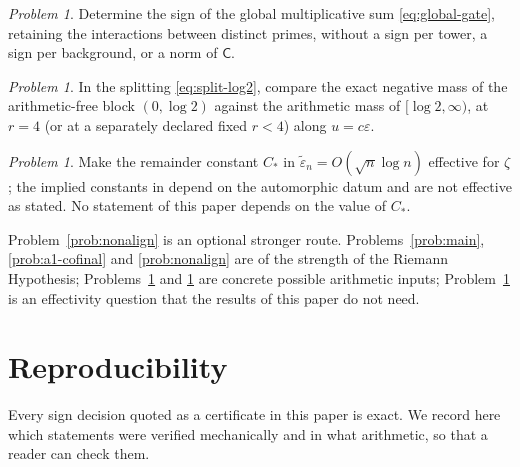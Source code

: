 \documentclass[11pt]{amsart}
\theoremstyle{definition}
\theoremstyle{remark}
\newtheorem{problem}[theorem]{Problem}
\theoremstyle{definition}
\newcommand{\eps}{\varepsilon}
\newcommand{\Cc}{\mathsf{C}}
\begin{document}
\begin{problem}\label{prob:global-sum}
Determine the sign of the global multiplicative sum \eqref{eq:global-gate}, retaining the
interactions between distinct primes, without a sign per tower, a sign per background, or a norm of
$\Cc$.
\end{problem}

\begin{problem}\label{prob:mass}
In the splitting \eqref{eq:split-log2}, compare the exact negative mass of the arithmetic-free block
$(0,\log2)$ against the arithmetic mass of $[\log2,\infty)$, at $r=4$ (or at a separately
declared fixed $r<4$) along $u=c\eps$.
\end{problem}

\begin{problem}\label{prob:effective}
Make the remainder constant $C_*$ in $\widetilde\eps_n=O(\sqrt n\log n)$ effective for $\zeta$;
the implied constants in \cite{Lagarias2007} depend on the automorphic datum and are not effective
as stated.  No statement of this paper depends on the value of $C_*$.
\end{problem}

Problem~\ref{prob:nonalign} is an optional stronger route. Problems~\ref{prob:main},
\ref{prob:a1-cofinal} and \ref{prob:nonalign} are of the strength of the Riemann Hypothesis;
Problems~\ref{prob:global-sum} and \ref{prob:mass} are concrete possible arithmetic inputs;
Problem~\ref{prob:effective} is an effectivity question that the results of this paper do not need.

\section{Reproducibility}\label{sec:repro}

Every sign decision quoted as a certificate in this paper is exact. We record here which
statements were verified mechanically and in what arithmetic, so that a reader can check them.
\end{document}
